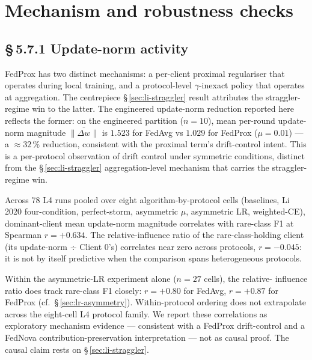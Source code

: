 \documentclass[11pt,a4paper]{report}
\begin{document}

\section{Mechanism and robustness checks}
\label{sec:mechanism-robustness}


\subsection*{\S\,5.7.1 Update-norm activity}

FedProx has two distinct mechanisms: a per-client proximal regulariser
that operates during local training, and a protocol-level $\gamma$-inexact
policy that operates at aggregation. The centrepiece
\S\,\ref{sec:li-straggler} result attributes the straggler-regime win to
the latter. The engineered update-norm reduction reported here reflects
the former: on the engineered partition ($n=10$), mean per-round
update-norm magnitude $\overline{\lVert \Delta w \rVert}$ is $1.523$ for
FedAvg vs $1.029$ for FedProx ($\mu = 0.01$) --- a $\approx 32\,\%$
reduction, consistent with the proximal term's drift-control intent. This
is a per-protocol observation of drift control under symmetric conditions,
distinct from the \S\,\ref{sec:li-straggler} aggregation-level mechanism
that carries the straggler-regime win.

Across 78 L4 runs pooled over eight algorithm-by-protocol cells (baselines,
Li 2020 four-condition, perfect-storm, asymmetric $\mu$, asymmetric LR,
weighted-CE), dominant-client mean update-norm magnitude correlates with
rare-class F1 at Spearman $r = +0.634$. The relative-influence ratio of the
rare-class-holding client (its update-norm $\div$ Client 0's) correlates
near zero across protocols, $r = -0.045$: it is not by itself predictive
when the comparison spans heterogeneous protocols.

Within the asymmetric-LR experiment alone ($n=27$ cells), the relative-
influence ratio does track rare-class F1 closely: $r = +0.80$ for FedAvg,
$r = +0.87$ for FedProx (cf.\ \S\,\ref{sec:lr-asymmetry}). Within-protocol
ordering does not extrapolate across the eight-cell L4 protocol family. We
report these correlations as exploratory mechanism evidence --- consistent
with a FedProx drift-control and a FedNova contribution-preservation
interpretation --- not as causal proof. The causal claim rests on
\S\,\ref{sec:li-straggler}.
\end{document}
